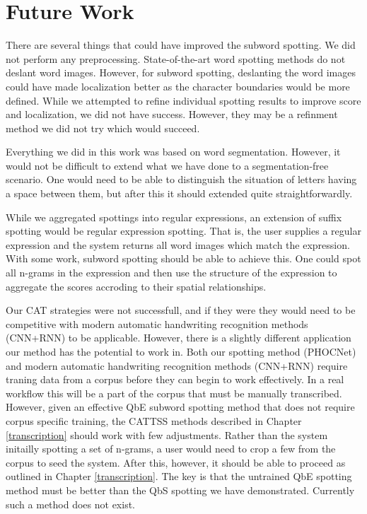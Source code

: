 \documentclass[ms,electronic,twosidetoc,letterpaper,chaptercenter,parttop,lof,lot]{byumsphd}
\begin{document}
\section{Future Work}



There are several things that could have improved the subword spotting. We did not perform any preprocessing. State-of-the-art word spotting methods do not deslant word images. However, for subword spotting, deslanting the word images could have made localization better as the character boundaries would be more defined. While we attempted to refine individual spotting results to improve score and localization, we did not have success. However, they may be a refinment method we did not try which would succeed.

Everything we did in this work was based on word segmentation. However, it would not be difficult to extend what we have done to a segmentation-free scenario. One would need to be able to distinguish the situation of letters having a space between them, but after this it should extended quite straightforwardly.

While we aggregated spottings into regular expressions, an extension of suffix spotting would be regular expression spotting. That is, the user supplies a regular expression and the system returns all word images which match the expression. With some work, subword spotting should be able to achieve this. One could spot all n-grams in the expression and then use the structure of the expression to aggregate the scores accroding to their spatial relationships.

Our CAT strategies were not successfull, and if they were they would need to be competitive with modern automatic handwriting recognition methods (CNN+RNN) to be applicable. However, there is a slightly different application our method has the potential to work in.
Both our spotting method (PHOCNet) and modern automatic handwriting recognition methods (CNN+RNN) require traning data from a corpus before they can begin to work effectively. In a real workflow this will be a part of the corpus that must be manually transcribed. However, given an effective QbE subword spotting method that does not require corpus specific training, the CATTSS methods described in Chapter \ref{transcription} should work with few adjustments. Rather than the system initailly spotting a set of n-grams, a user would need to crop a few from the corpus to seed the system. After this, however, it should be able to proceed as outlined in Chapter \ref{transcription}.
The key is that the untrained QbE spotting method must be better than the QbS spotting we have demonstrated. Currently such a method does not exist.
\end{document}
